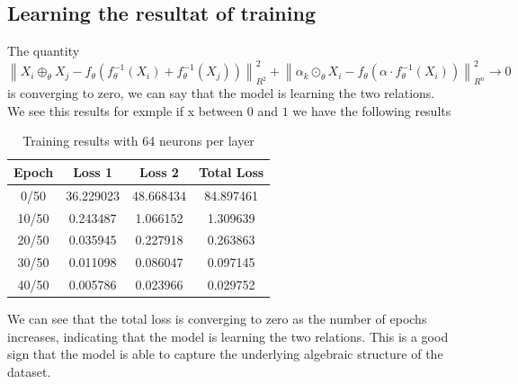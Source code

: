 \documentclass{report}
\begin{document}
        \subsection{Learning the resultat of training}
        The quantity $$
            \left\|X_i \oplus_\theta X_j-f_\theta\left(f_\theta^{-1}\left(X_i\right)+f_\theta^{-1}\left(X_j\right)\right)\right\|_{R^2}^2+\left\|\alpha_k \odot_\theta X_i-f_\theta\left(\alpha \cdot f_\theta^{-1}\left(X_i\right)\right)\right\|_{R^n}^2 \rightarrow 0
        $$ is converging to zero, we can say that the model is learning the two relations.\\
        We see this results for exmple if x between $ 0 $ and $ 1 $ we have the following results
        \begin{table}[h]
            \centering
            \begin{tabular}{|c|c|c|c|}
            \hline
            Epoch & Loss 1 & Loss 2 & Total Loss \\
            \hline
            0/50 & 36.229023 & 48.668434 & 84.897461 \\
            10/50 & 0.243487 & 1.066152 & 1.309639 \\
            20/50 & 0.035945 & 0.227918 & 0.263863 \\
            30/50 & 0.011098 & 0.086047 & 0.097145 \\
            40/50 & 0.005786 & 0.023966 & 0.029752 \\
            \hline
            \end{tabular}
            \caption{Training results with 64 neurons per layer}
            \label{tab:training_results}
            \end{table}
    We can see that the total loss is converging to zero as the number of epochs increases, 
    indicating that the model is learning the two relations. This is a good sign that the
    model is able to capture the underlying algebraic structure of the dataset.\\
\end{document}
